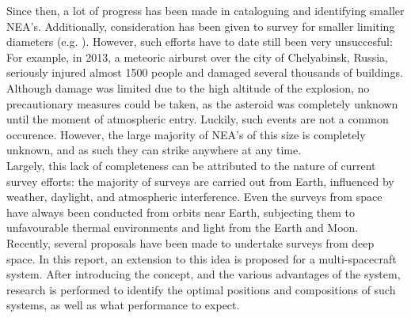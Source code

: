 Since then, a lot of progress has been made in cataloguing and identifying smaller NEA's. Additionally, consideration has been given to survey for smaller limiting diameters (e.g. \cite{2003NEOSDT}). However, such efforts have to date still been very unsuccesful: For example, in 2013, a meteoric airburst over the city of Chelyabinsk, Russia, seriously injured almost 1500 people and damaged several thousands of buildings. Although damage was limited due to the high altitude of the explosion, no precautionary measures could be taken, as the asteroid was completely unknown until the moment of atmospheric entry. Luckily, such events are not a common occurence. However, the large majority of NEA's of this size is completely unknown, and as such they can strike anywhere at any time. \\

Largely, this lack of completeness can be attributed to the nature of current survey efforts: the majority of surveys are carried out from Earth, influenced by weather, daylight, and atmospheric interference. Even the surveys from space have always been conducted from orbits near Earth, subjecting them to unfavourable thermal environments and light from the Earth and Moon. Recently, several proposals have been made to undertake surveys from deep space. In this report, an extension to this idea is proposed for a multi-spacecraft system. After introducing the concept, and the various advantages of the system, research is performed to identify the optimal positions and compositions of such systems, as well as what performance to expect.
